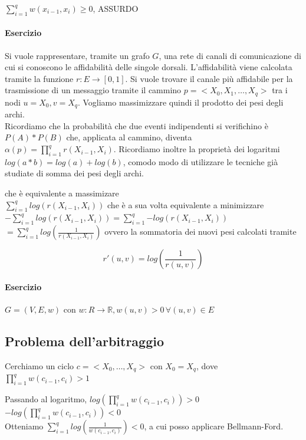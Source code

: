 \documentclass[tikz]{article}
\let\oldparagraph\paragraph
\renewcommand{\paragraph}[1]{\oldparagraph{#1}\mbox{}}
\begin{document}
{{$\sum_{i=1}^q{w(x_{i-1},x_i)} \geq 0$, ASSURDO


\paragraph{Esercizio}

Si vuole rappresentare, tramite un grafo $G$, una rete di canali di comunicazione di cui si conoscono le affidabilità delle singole dorsali. L'affidabilità viene calcolata tramite la funzione $r : E \rightarrow [0,1]$. Si vuole trovare il canale più affidabile per la trasmissione di un messaggio tramite il cammino $p = <X_0,X_1,\ldots,X_q>$ tra i nodi $u =X_0,v=X_q$. Vogliamo massimizzare quindi il prodotto dei pesi degli archi. \\
Ricordiamo che la probabilità che due eventi indipendenti si verifichino è $P(A) * P(B)$ che, applicata al cammino, diventa $\alpha(p) = \prod_{i=1}^{q}{r(X_{i-1},X_i)}$. Ricordiamo inoltre la proprietà dei logaritmi $log(a*b) = log(a) + log(b)$, comodo modo di utilizzare le tecniche già studiate di somma dei pesi degli archi.


che è equivalente a massimizare \\ 		 
$\sum_{i=1}^q{log(r(X_{i-1},X_i))}$
che è a sua volta equivalente a minimizzare \\
$-\sum_{i=1}^q{log(r(X_{i-1},X_i))} = \sum_{i=1}^q{-log(r(X_{i-1},X_i))}$ \\
$ = \sum_{i=1}^q{log(\frac{1}{r(X_{i-1},X_i)})}$ ovvero la sommatoria dei nuovi pesi calcolati tramite 

\begin{equation}
r'(u,v) = log(\frac{1}{r(u,v)})
\end{equation}

\paragraph{Esercizio}

$G=(V,E,w)$ con $w: R \rightarrow \mathbb{R}, w(u,v) >0\,\forall (u,v) \in E$


\subsection{Problema dell'arbitraggio}
Cerchiamo un ciclo $c = <X_0,\ldots,X_q>$ con $X_0 = X_q$, dove $\prod_{i=1}^q{w(c_{i-1},c_i)} > 1$

Passando al logaritmo, $log(\prod_{i=1}^q{w(c_{i-1},c_i)}) > 0$ \\
$-log(\prod_{i=1}^q{w(c_{i-1},c_i)}) < 0$ \\
Otteniamo $\sum_{i=1}^q{log(\frac{1}{w(c_{i-1},c_i)})} < 0$, a cui posso applicare Bellmann-Ford.

}}
\end{document}
